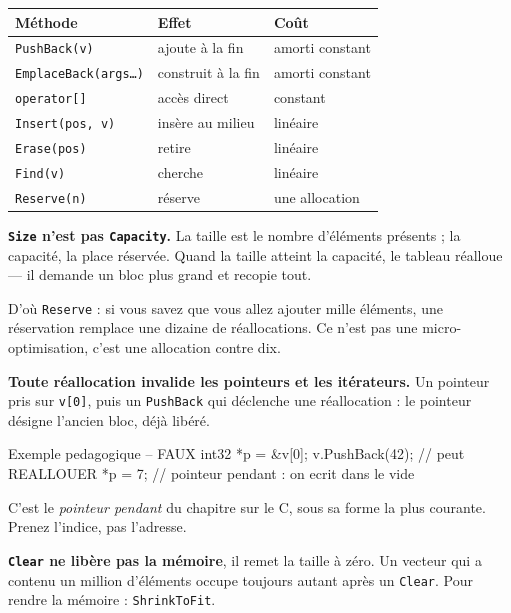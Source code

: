 \begin{center}
\begin{tabular}{@{}lll@{}}
\toprule
\textbf{Méthode} & \textbf{Effet} & \textbf{Coût} \\
\midrule
\texttt{PushBack(v)} & ajoute à la fin & amorti constant \\
\texttt{EmplaceBack(args\dots)} & construit à la fin & amorti constant \\
\texttt{operator[]} & accès direct & constant \\
\texttt{Insert(pos, v)} & insère au milieu & linéaire \\
\texttt{Erase(pos)} & retire & linéaire \\
\texttt{Find(v)} & cherche & linéaire \\
\texttt{Reserve(n)} & réserve & une allocation \\
\bottomrule
\end{tabular}
\end{center}

\begin{nkretenir}
\textbf{\texttt{Size} n'est pas \texttt{Capacity}.} La taille est le nombre
d'éléments présents ; la capacité, la place réservée. Quand la taille atteint la
capacité, le tableau réalloue --- il demande un bloc plus grand et recopie tout.

D'où \texttt{Reserve} : si vous savez que vous allez ajouter mille éléments, une
réservation remplace une dizaine de réallocations. Ce n'est pas une
micro-optimisation, c'est une allocation contre dix.
\end{nkretenir}

\begin{nkpiege}
\textbf{Toute réallocation invalide les pointeurs et les itérateurs.} Un
pointeur pris sur \texttt{v[0]}, puis un \texttt{PushBack} qui déclenche une
réallocation : le pointeur désigne l'ancien bloc, déjà libéré.

\begin{nkcode}{Exemple pedagogique -- FAUX}
int32 *p = &v[0];
v.PushBack(42);      // peut REALLOUER
*p = 7;              // pointeur pendant : on ecrit dans le vide
\end{nkcode}

C'est le \emph{pointeur pendant} du chapitre sur le C, sous sa forme la plus
courante. Prenez l'indice, pas l'adresse.
\end{nkpiege}

\begin{nkpiege}
\textbf{\texttt{Clear} ne libère pas la mémoire}, il remet la taille à zéro. Un
vecteur qui a contenu un million d'éléments occupe toujours autant après un
\texttt{Clear}. Pour rendre la mémoire : \texttt{ShrinkToFit}.
\end{nkpiege}

